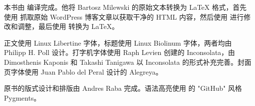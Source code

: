 \lettrine[lraise=-0.03,loversize=0.08]{本}{书}由  编译完成。他将 Bartosz Milewski 的原始文本转换为 \LaTeX{} 格式，首先使用  抓取原始 WordPress 博客文章以获取干净的 HTML 内容，然后使用  进行修改和调整，最后使用  转换为 \LaTeX{}。

正文使用 Linux Libertine 字体，标题使用 Linux Biolinum 字体，两者均由 Philipp H. Poll 设计。打字机字体使用 Raph Levien 创建的 Inconsolata，由 Dimosthenis Kaponis 和 Takashi Tanigawa 以 Inconsolata  的形式补充完善。封面页字体使用 Juan Pablo del Peral 设计的 Alegreya。

原书的版式设计和排版由 Andres Raba 完成。语法高亮使用  的 "GitHub" 风格 Pygments。
\ifdefined\OPTCustomLanguage{%
    
  }
\fi